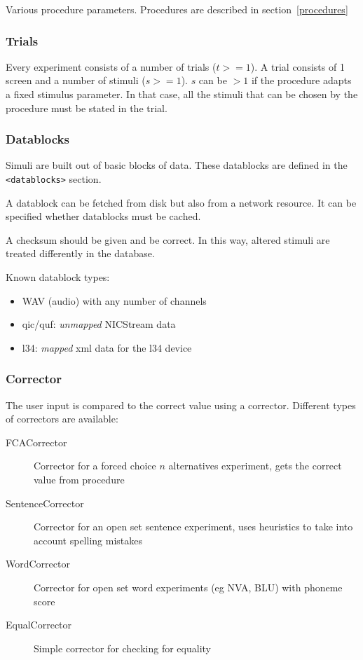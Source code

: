 \documentclass[a4paper,12pt]{article}
\begin{document}
Various procedure parameters. Procedures are described in section~\ref{procedures}

\subsubsection{Trials}

Every experiment consists of a number of trials ($t>=1$). A trial consists of 1 screen and a number of stimuli ($s>=1$). $s$ can be $>1$ if the procedure adapts a fixed stimulus parameter. In that case, all the stimuli that can be chosen by the procedure must be stated in the trial. 

\subsubsection{Datablocks}

Simuli are built out of basic blocks of data. These datablocks are defined in the \texttt{<datablocks>} section. 

A datablock can be fetched from disk but also from a network resource. It can be specified whether datablocks must be cached.

A checksum should be given and be correct. In this way, altered stimuli are treated differently in the database. 

Known datablock types:

\begin{itemize}
\item WAV (audio) with any number of channels
\item qic/quf: \emph{unmapped} NICStream data
\item l34: \emph{mapped} xml data for the l34 device
\end{itemize}

\subsubsection{Corrector}

The user input is compared to the correct value using a corrector. Different types of correctors are available:

\begin{description}
\item[FCACorrector] Corrector for a forced choice $n$ alternatives experiment, gets the correct value from procedure
\item[SentenceCorrector] Corrector for an open set sentence experiment, uses heuristics to take into account spelling mistakes
\item[WordCorrector] Corrector for open set word experiments (eg NVA, BLU) with phoneme score
\item[EqualCorrector] Simple corrector for checking for equality
\end{description}
\end{document}

